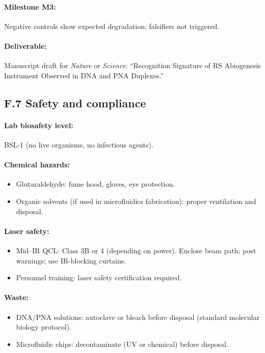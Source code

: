 \documentclass[11pt]{article}
\begin{document}
\paragraph{Milestone M3:} Negative controls show expected degradation; falsifiers not triggered.

\paragraph{Deliverable:} Manuscript draft for \emph{Nature} or \emph{Science}: ``Recognition Signature of RS Abiogenesis Instrument Observed in DNA and PNA Duplexes.''

\subsection*{F.7 Safety and compliance}

\paragraph{Lab biosafety level:} BSL-1 (no live organisms, no infectious agents).

\paragraph{Chemical hazards:}
\begin{itemize}
\item Glutaraldehyde: fume hood, gloves, eye protection.
\item Organic solvents (if used in microfluidics fabrication): proper ventilation and disposal.
\end{itemize}

\paragraph{Laser safety:}
\begin{itemize}
\item Mid–IR QCL: Class 3B or 4 (depending on power). Enclose beam path; post warnings; use IR-blocking curtains.
\item Personnel training: laser safety certification required.
\end{itemize}

\paragraph{Waste:}
\begin{itemize}
\item DNA/PNA solutions: autoclave or bleach before disposal (standard molecular biology protocol).
\item Microfluidic chips: decontaminate (UV or chemical) before disposal.
\end{itemize}
\end{document}
